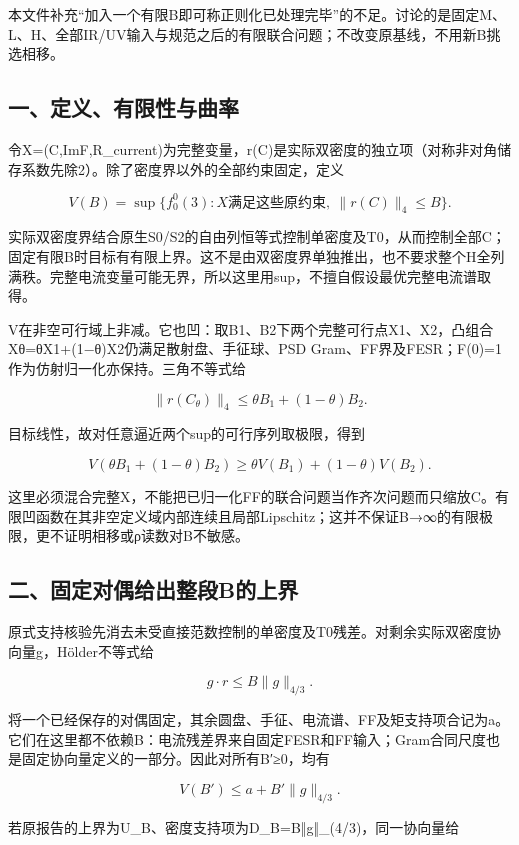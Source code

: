 \documentclass[
  10pt,
  a4paper,
]{article}
\begin{document}
本文件补充``加入一个有限B即可称正则化已处理完毕''的不足。讨论的是固定M、L、H、全部IR/UV输入与规范之后的有限联合问题；不改变原基线，不用新B挑选相移。

\subsection{一、定义、有限性与曲率}\label{ux4e00ux5b9aux4e49ux6709ux9650ux6027ux4e0eux66f2ux7387}

令X=(C,ImF,R\_current)为完整变量，r(C)是实际双密度的独立项（对称非对角储存系数先除2）。除了密度界以外的全部约束固定，定义

\[
V(B)=\sup\{f_0^0(3):X\text{满足这些原约束},\ \|r(C)\|_4\le B\}.
\]

实际双密度界结合原生S0/S2的自由列恒等式控制单密度及T0，从而控制全部C；固定有限B时目标有有限上界。这不是由双密度界单独推出，也不要求整个H全列满秩。完整电流变量可能无界，所以这里用sup，不擅自假设最优完整电流谱取得。

V在非空可行域上非减。它也凹：取B1、B2下两个完整可行点X1、X2，凸组合Xθ=θX1+(1−θ)X2仍满足散射盘、手征球、PSD
Gram、FF界及FESR；F(0)=1作为仿射归一化亦保持。三角不等式给

\[
\|r(C_\theta)\|_4\le\theta B_1+(1-\theta)B_2.
\]

目标线性，故对任意逼近两个sup的可行序列取极限，得到

\[
V(\theta B_1+(1-\theta)B_2)\ge\theta V(B_1)+(1-\theta)V(B_2).
\]

这里必须混合完整X，不能把已归一化FF的联合问题当作齐次问题而只缩放C。有限凹函数在其非空定义域内部连续且局部Lipschitz；这并不保证B→∞的有限极限，更不证明相移或ρ读数对B不敏感。

\subsection{二、固定对偶给出整段B的上界}\label{ux4e8cux56faux5b9aux5bf9ux5076ux7ed9ux51faux6574ux6bb5bux7684ux4e0aux754c}

原式支持核验先消去未受直接范数控制的单密度及T0残差。对剩余实际双密度协向量g，Hölder不等式给

\[
g\cdot r\le B\|g\|_{4/3}.
\]

将一个已经保存的对偶固定，其余圆盘、手征、电流谱、FF及矩支持项合记为a。它们在这里都不依赖B：电流残差界来自固定FESR和FF输入；Gram合同尺度也是固定协向量定义的一部分。因此对所有B′≥0，均有

\[
V(B')\le a+B'\|g\|_{4/3}.
\]

若原报告的上界为U\_B、密度支持项为D\_B=B‖g‖\_(4/3)，同一协向量给
\end{document}
